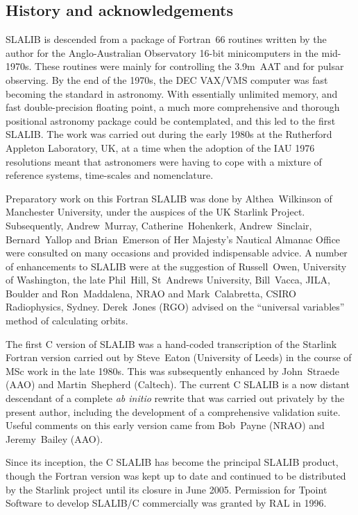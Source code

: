 \documentclass[11pt,fleqn,twoside]{article}
\renewcommand{\_}{{\tt\char'137}}     %
\begin{document}
\subsection{History and acknowledgements}
SLALIB is descended from a package of Fortran~66 routines written
by the author
for the Anglo-Australian Observatory 16-bit minicomputers
in the mid-1970s.  These routines were mainly for controlling the
3.9m~AAT and for pulsar observing.  By the end of the 1970s, the
DEC VAX/VMS computer was fast becoming the standard in
astronomy.  With essentially unlimited memory, and fast
double-precision floating point, a much more comprehensive and thorough
positional astronomy package could be contemplated, and this led to the
first SLALIB.  The work was carried out during the early 1980s at the
Rutherford Appleton Laboratory, UK, at a time when the adoption
of the IAU 1976 resolutions meant that astronomers were having to cope
with a mixture of reference systems, time-scales and nomenclature.
 
Preparatory work on this Fortran SLALIB was done by
Althea~Wilkinson of Manchester University, under the auspices of
the UK Starlink Project.
Subsequently,
Andrew~Murray,
Catherine~Hohenkerk,
Andrew~Sinclair,
Bernard~Yallop
and
Brian~Emerson of Her Majesty's Nautical Almanac Office were consulted
on many occasions and provided indispensable advice.
A number of enhancements to SLALIB were at the suggestion of
Russell~Owen, University of Washington,
the late Phil~Hill, St~Andrews University,
Bill~Vacca, JILA, Boulder and
Ron~Maddalena, NRAO and
Mark~Calabretta, CSIRO Radiophysics, Sydney.
Derek~Jones (RGO) advised on the
``universal variables'' method of calculating orbits.
 
The first C version of SLALIB was a hand-coded transcription
of the Starlink Fortran version carried out by
Steve~Eaton (University of Leeds) in the course of
MSc work in the late 1980s.  This was
subsequently enhanced by John~Straede (AAO)
and Martin~Shepherd (Caltech).
The current C SLALIB is a now distant descendant of
a complete {\it ab initio}\/
rewrite that was carried out privately by the present author,
including the development of a comprehensive validation suite.
Useful comments on this early version came from Bob~Payne (NRAO) and
Jeremy~Bailey (AAO).
 
Since its inception, the C SLALIB has become
the principal SLALIB product, though the Fortran version was kept
up to date and continued to be distributed
by the Starlink project until its closure in June 2005.
Permission for Tpoint Software to develop SLALIB/C commercially
was granted by RAL in 1996.
 
\end{document}
